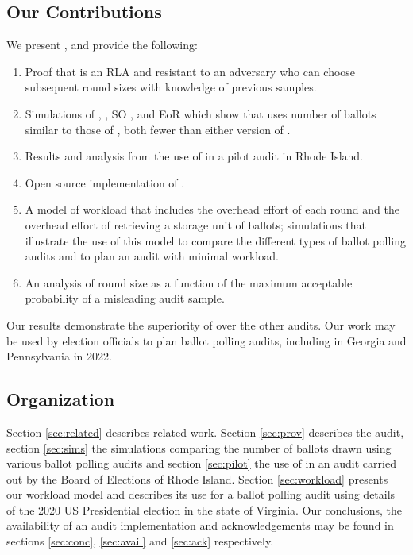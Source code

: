 \subsection{Our Contributions}
We present \Providence, and provide the following:
\begin{enumerate}
\item Proof that \Providence is an RLA and resistant to an adversary who can choose subsequent round sizes with knowledge of previous samples.
\item Simulations of \Providence, \Minerva, SO \BRAVO, and EoR \BRAVO which show that \Providence uses number of ballots similar to those of \Minerva, both fewer than either version of \BRAVO.
\item Results and analysis from the use of \Providence in a pilot audit in Rhode Island.
\item Open source implementation of \Providence. 
\item A model of workload that includes the overhead effort of each round and the overhead effort of retrieving a storage unit of ballots; simulations that illustrate the use of this model to compare the different types of ballot polling audits and to plan an audit with minimal workload.
\item An analysis of round size as a function of the maximum acceptable probability of a misleading audit sample.
\end{enumerate}

Our results demonstrate the superiority of \Providence over the other audits. Our work may be used by election officials to plan ballot polling audits, including in Georgia and Pennsylvania in 2022. 

\subsection{Organization} 
Section \ref{sec:related} describes related work. Section \ref{sec:prov} describes the \Providence audit, section \ref{sec:sims} the simulations comparing the number of ballots drawn using various ballot polling audits and section \ref{sec:pilot} the use of \Providence in an audit carried out by the Board of Elections of Rhode Island. Section \ref{sec:workload} presents our workload model and describes its use for a ballot polling audit using details of the 2020 US Presidential election in the state of Virginia. Our conclusions, the availability of an audit implementation and acknowledgements may be found in sections \ref{sec:conc}, \ref{sec:avail} and \ref{sec:ack} respectively. 


